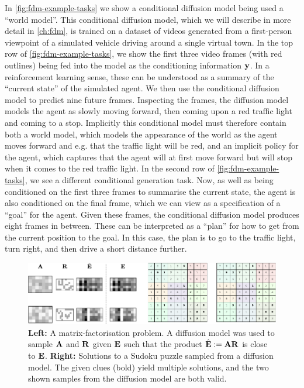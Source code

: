 In \cref{fig:fdm-example-tasks} we show a conditional diffusion model being used a ``world model''. This conditional diffusion model, which we will describe in more detail in \cref{ch:fdm}, is trained on a dataset of videos generated from a first-person viewpoint of a simulated vehicle driving around a single virtual town. In the top row of \cref{fig:fdm-example-tasks}, we show the first three video frames (with red outlines) being fed into the model as the conditioning information ${\mathbf{y}}$. In a reinforcement learning sense, these can be understood as a summary of the ``current state'' of the simulated agent. We then use the conditional diffusion model to predict nine future frames. Inspecting the frames, the diffusion model models the agent as slowly moving forward, then coming upon a red traffic light and coming to a stop. Implicitly this conditional model must therefore contain both a world model, which models the appearance of the world as the agent moves forward and e.g. that the traffic light will be red, and an implicit policy for the agent, which captures that the agent will at first move forward but will stop when it comes to the red traffic light. In the second row of \cref{fig:fdm-example-tasks}, we see a different conditional generation task. Now, as well as being conditioned on the first three frames to summarise the current state, the agent is also conditioned on the final frame, which we can view as a specification of a ``goal'' for the agent. Given these frames, the conditional diffusion model produces eight frames in between. These can be interpreted as a ``plan'' for how to get from the current position to the goal. In this case, the plan is to go to the traffic light, turn right, and then drive a short distance further.

\begin{figure}
    \centering
    \includegraphics[width=\textwidth]{figs/thesis/gsdm-examples.pdf}
    \caption{
        \textbf{Left:} A matrix-factorisation problem. A diffusion model was used to sample ${\mathbf{A}}$ and ${\mathbf{R}}$ given ${\mathbf{E}}$ such that the product $\hat{{\mathbf{E}}} := {\mathbf{A}} {\mathbf{R}}$ is close to ${\mathbf{E}}$. \textbf{Right:} Solutions to a Sudoku puzzle sampled from a diffusion model. The given clues (bold) yield multiple solutions, and the two shown samples from the diffusion model are both valid.
    }
    \label{fig:gsdm-examples}
\end{figure}

